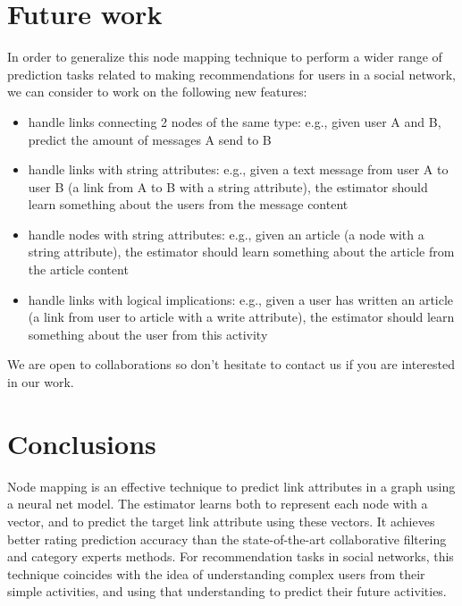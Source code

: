 \documentclass{article}
\begin{document}
\section{Future work}
In order to generalize this node mapping technique to perform a wider range of 
prediction tasks related to making recommendations for users in a social 
network, we can consider to work on the following new features:
\begin{itemize}
	\item handle links connecting 2 nodes of the same type: e.g., given user A 
	and B, predict the amount of messages A send to B
	\item handle links with string attributes: e.g., given a text message from 
	user A to user B (a link from A to B with a string attribute), the 
	estimator should learn something about the users from the message content
	\item handle nodes with string attributes: e.g., given an article (a node 
	with a string attribute), the estimator should learn something about the 
	article from the article content
	\item handle links with logical implications: e.g., given a user has 
	written an article (a link from user to article with a write attribute), 
	the estimator should learn something about the user from this activity
\end{itemize}
We are open to collaborations so don't hesitate to contact us if you are 
interested in our work.

\section{Conclusions}
Node mapping is an effective technique to predict link attributes in a graph 
using a neural net model.
The estimator learns both to represent each node with a vector, and to predict 
the target link attribute using these vectors.
It achieves better rating prediction accuracy than the state-of-the-art 
collaborative filtering and category experts methods.
For recommendation tasks in social networks, this technique coincides with the 
idea of understanding complex users from their simple activities, and using 
that understanding to predict their future activities.



\end{document}
